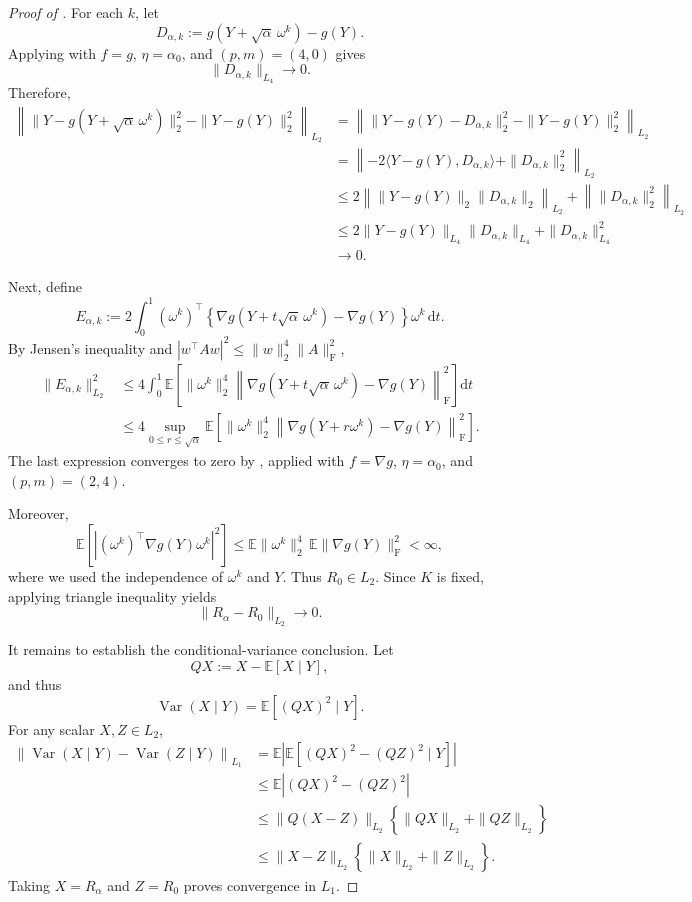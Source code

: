 \documentclass[12pt]{article}
\def\E{\mathbb{E}}
\newcommand{\tran}{^\intercal}
\newcommand{\rd}{{\mathrm{d}}}
\theoremstyle{general}
\begin{document}
\begin{proof}[Proof of ]
For each $k$, let
\[
D_{\alpha,k}
:=
g(Y+\sqrt\alpha\,\omega^k)-g(Y).
\]
Applying  with
$f=g$, $\eta=\alpha_0$, and $(p,m)=(4,0)$ gives
\[
\|D_{\alpha,k}\|_{L_4}\longrightarrow0.
\]
Therefore,
\begin{align*}
\left\|
\|Y-g(Y+\sqrt\alpha\,\omega^k)\|_2^2
-
\|Y-g(Y)\|_2^2
\right\|_{L_2}&=\left\| \|Y - g(Y) - D_{\alpha,k}\|_2^2 - \|Y - g(Y)\|_2^2 \right\|_{L_2}\\
&= \left\|- 2 \langle Y-g(Y), D_{\alpha,k}\rangle + \|D_{\alpha,k}\|_2^2  \right\|_{L_2}\\
&\leq 2\left\|  \|Y-g(Y)\|_2\| D_{\alpha,k}\|_2 \right\|_{L_2} + \left\| \|D_{\alpha,k}\|_2^2 \right\|_{L_2}\\
&\leq 2\|Y-g(Y)\|_{L_4}\|D_{\alpha,k}\|_{L_4}
+
\|D_{\alpha,k}\|_{L_4}^2\\
&\longrightarrow0.
\end{align*}

Next, define
\[
E_{\alpha,k}
:=
2\int_0^1
(\omega^k)\tran
\left\{
\nabla g(Y+t\sqrt\alpha\,\omega^k)-\nabla g(Y)
\right\}
\omega^k\,\rd t.
\]
By Jensen's inequality and
$|w^\top A w|^2\leq\|w\|_2^4\|A\|_{\mathrm F}^2$,
\begin{align*}
\|E_{\alpha,k}\|_{L_2}^2
&\leq
4\int_0^1
\mathbb E\!\left[
\|\omega^k\|_2^4
\left\|
\nabla g(Y+t\sqrt\alpha\,\omega^k)-\nabla g(Y)
\right\|_{\mathrm F}^2
\right]\rd t\\
&\leq
4\sup_{0\leq r\leq\sqrt\alpha}
\mathbb E\!\left[
\|\omega^k\|_2^4
\left\|
\nabla g(Y+r\omega^k)-\nabla g(Y)
\right\|_{\mathrm F}^2
\right].
\end{align*}
The last expression converges to zero by
, applied with
$f=\nabla g$, $\eta=\alpha_0$, and $(p,m)=(2,4)$.

Moreover,
\[
\mathbb E\left[
\left|
(\omega^k)\tran\nabla g(Y)\omega^k
\right|^2
\right]
\leq
\mathbb E\|\omega^k\|_2^4\,
\mathbb E\|\nabla g(Y)\|_{\mathrm F}^2
<\infty,
\]
where we used the independence of $\omega^k$ and $Y$. Thus $R_0\in
L_2$. Since $K$ is fixed, applying triangle inequality yields
\[
\|R_\alpha-R_0\|_{L_2}\longrightarrow0.
\]

It remains to establish the conditional-variance conclusion. Let
\[
QX:=X-\mathbb E[X\mid Y],
\]
and thus
\[
\operatorname{Var}(X\mid Y)
=
\mathbb E[(QX)^2\mid Y].
\]
For any scalar $X,Z\in L_2$,
\begin{align*} 
    \left\| \operatorname{Var}(X\mid Y) - \operatorname{Var}(Z\mid Y) \right\|_{L_1} &=\E\left| \E[ (QX)^2 - (QZ)^2 \mid Y ] \right| \\ 
    &\leq \mathbb E\left| (QX)^2-(QZ)^2 \right|\\ 
    &\leq \|Q(X-Z)\|_{L_2} \left\{ \|QX\|_{L_2}+\|QZ\|_{L_2} \right\}\\ 
    &\leq \|X-Z\|_{L_2} \left\{ \|X\|_{L_2}+\|Z\|_{L_2} \right\}. 
\end{align*}
Taking $X=R_\alpha$ and $Z=R_0$ proves convergence in $L_1$.
\end{proof}
\end{document}
